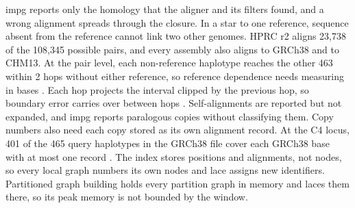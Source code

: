 impg reports only the homology that the aligner and its filters found, and a wrong alignment spreads through the closure.
In a star to one reference, sequence absent from the reference cannot link two other genomes.
HPRC r2 aligns 23,738 of the 108,345 possible pairs, and every assembly also aligns to GRCh38 and to CHM13.
At the pair level, each non-reference haplotype reaches the other 463 within 2 hops without either reference, so reference dependence needs measuring in bases .
Each hop projects the interval clipped by the previous hop, so boundary error carries over between hops .
Self-alignments are reported but not expanded, and impg reports paralogous copies without classifying them.
Copy numbers also need each copy stored as its own alignment record.
At the C4 locus, 401 of the 465 query haplotypes in the GRCh38 file cover each GRCh38 base with at most one record .
The index stores positions and alignments, not nodes, so every local graph numbers its own nodes and lace assigns new identifiers.
Partitioned graph building holds every partition graph in memory and laces them there, so its peak memory is not bounded by the window.
